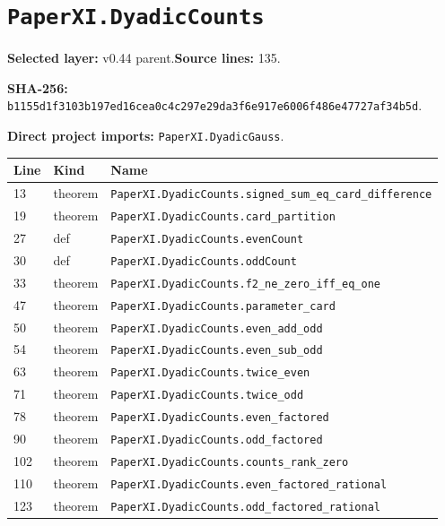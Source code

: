 \documentclass[10pt,oneside]{book}
\begin{document}
\section{\texorpdfstring{\nolinkurl{PaperXI.DyadicCounts}}{PaperXI.DyadicCounts}}\label{module:PaperXI.DyadicCounts}

\textbf{Selected layer:} v0.44 parent.\quad\textbf{Source lines:} 135.\par\textbf{SHA-256:} {\scriptsize\nolinkurl{b1155d1f3103b197ed16cea0c4c297e29da3f6e917e6006f486e47727af34b5d}}.


\textbf{Direct project imports:} \nolinkurl{PaperXI.DyadicGauss}.

\begin{longtable}{@{}p{}p{}p{}@{}}\toprule Line&Kind&Name\\\midrule\endhead

13&theorem&\nolinkurl{PaperXI.DyadicCounts.signed_sum_eq_card_difference}\\

19&theorem&\nolinkurl{PaperXI.DyadicCounts.card_partition}\\

27&def&\nolinkurl{PaperXI.DyadicCounts.evenCount}\\

30&def&\nolinkurl{PaperXI.DyadicCounts.oddCount}\\

33&theorem&\nolinkurl{PaperXI.DyadicCounts.f2_ne_zero_iff_eq_one}\\

47&theorem&\nolinkurl{PaperXI.DyadicCounts.parameter_card}\\

50&theorem&\nolinkurl{PaperXI.DyadicCounts.even_add_odd}\\

54&theorem&\nolinkurl{PaperXI.DyadicCounts.even_sub_odd}\\

63&theorem&\nolinkurl{PaperXI.DyadicCounts.twice_even}\\

71&theorem&\nolinkurl{PaperXI.DyadicCounts.twice_odd}\\

78&theorem&\nolinkurl{PaperXI.DyadicCounts.even_factored}\\

90&theorem&\nolinkurl{PaperXI.DyadicCounts.odd_factored}\\

102&theorem&\nolinkurl{PaperXI.DyadicCounts.counts_rank_zero}\\

110&theorem&\nolinkurl{PaperXI.DyadicCounts.even_factored_rational}\\

123&theorem&\nolinkurl{PaperXI.DyadicCounts.odd_factored_rational}\\

\bottomrule\end{longtable}
\end{document}
